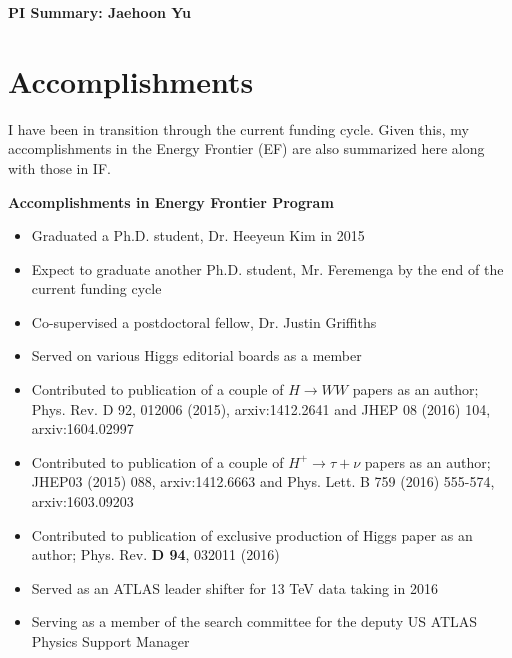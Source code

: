 \begin{center}
\LARGE\textbf{PI Summary: Jaehoon Yu}
\end{center}

\section*{\textbf{Accomplishments}}
I have been in transition through the current funding cycle.  Given this, my accomplishments in the Energy Frontier (EF) are also summarized here along with those in IF. 

\noindent\textbf{Accomplishments in Energy Frontier Program}
\begin{itemize}[noitemsep,nolistsep]
\item{Graduated a Ph.D. student, Dr. Heeyeun Kim in 2015}
\item{Expect to graduate another Ph.D. student, Mr. Feremenga by the end of the current funding cycle}
\item{Co-supervised a postdoctoral fellow, Dr. Justin Griffiths}
\item{Served on various Higgs editorial boards as a member}
\item{Contributed to publication of a couple of $H\rightarrow WW$ papers as an author; Phys. Rev. D 92, 012006 (2015), arxiv:1412.2641 and JHEP 08 (2016) 104, arxiv:1604.02997}
\item{Contributed to publication of a couple of $H^{+}\rightarrow \tau+\nu$ papers as an author; JHEP03 (2015) 088, arxiv:1412.6663 and Phys. Lett. B 759 (2016) 555-574, arxiv:1603.09203}
\item{Contributed to publication of exclusive production of Higgs paper as an author; Phys. Rev. {\bf D 94}, 032011 (2016)}
\item{Served as an ATLAS leader shifter for 13 TeV data taking in 2016}
\item{Serving as a member of the search committee for the deputy US ATLAS Physics Support Manager}
\end{itemize}

